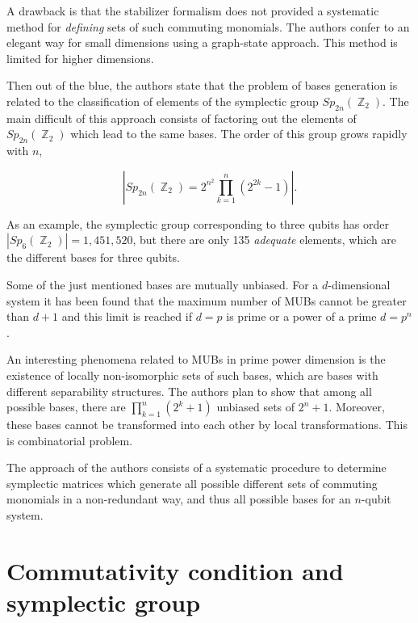 \documentclass[a4paper,11pt]{report}
\DeclareMathOperator{\Z}{\mathbb{Z}}
\begin{document}
    A drawback is that the stabilizer formalism does not
    provided a systematic method for \textit{defining} sets
    of such commuting monomials. The authors confer to an
    elegant way for small dimensions using a graph-state
    approach. This method is limited for higher dimensions.

    Then out of the blue, the authors state that the problem
    of bases generation is related to the classification of
    elements of the symplectic group $Sp_{2n}(\Z_2)$. The
    main difficult of this approach consists of factoring
    out the elements of $Sp_{2n}(\Z_2)$ which lead to the
    same bases. The order of this group grows rapidly with
    $n$,

    \begin{equation}
        \left|
        Sp_{2n}(\Z_2)
        = 2^{n^2} \prod_{k=1}^{n} \left( 2^{2k} - 1 \right) 
        \right|.
    \end{equation}

    As an example, the symplectic group corresponding to
    three qubits has order $|Sp_{6}(\Z_2)| = 1,451,520$, but
    there are only 135 \textit{adequate} elements, which are
    the different bases for three qubits.

    Some of the just mentioned bases are mutually unbiased.
    For a $d$-dimensional system it has been found that the
    maximum number of MUBs cannot be greater than $d+1$ and
    this limit is reached if $d = p$ is prime or a power of
    a prime $d = p^{n}$.

    An interesting phenomena related to MUBs in prime power
    dimension is the existence of locally non-isomorphic
    sets of such bases, which are bases with different
    separability structures. The authors plan to show that
    among all possible bases, there are
    $\prod_{k=1}^{n}\left( 2^{k}+1 \right)$ unbiased sets of
    $2^{n}+1$. Moreover, these bases cannot be transformed
    into each other by local transformations. This is
    combinatorial problem.

    The approach of the authors consists of a systematic
    procedure to determine symplectic matrices which
    generate all possible different sets of commuting
    monomials in a non-redundant way, and thus all possible
    bases for an $n$-qubit system.

    \section{Commutativity condition and symplectic group}
\end{document}
